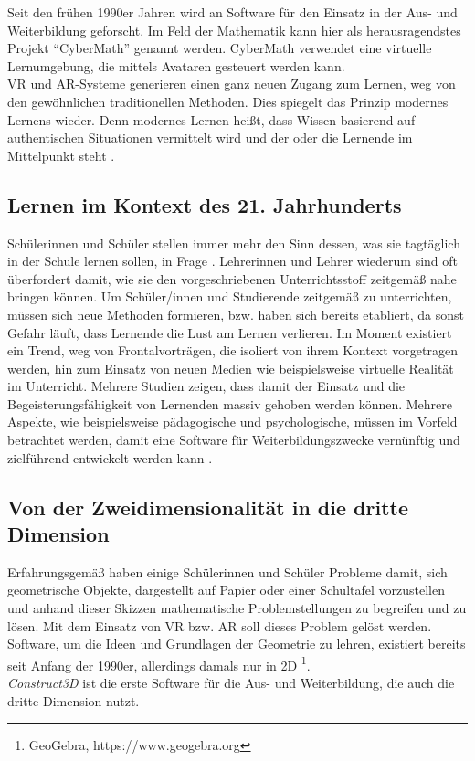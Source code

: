 \documentclass[deutsch]{llncs}
\begin{document}
Seit den frühen 1990er Jahren wird an Software für den Einsatz in der Aus- und Weiterbildung geforscht. Im Feld der Mathematik kann hier als herausragendstes Projekt ``CyberMath'' genannt werden. CyberMath verwendet eine virtuelle Lernumgebung, die mittels Avataren gesteuert werden kann. \\
VR und AR-Systeme generieren einen ganz neuen Zugang zum Lernen, weg von den gewöhnlichen traditionellen Methoden. Dies spiegelt das Prinzip modernes Lernens wieder. Denn modernes Lernen heißt, dass Wissen basierend auf authentischen Situationen vermittelt wird und der oder die Lernende im Mittelpunkt steht \cite{Klampfer,unknown}.

\subsection{Lernen im Kontext des 21. Jahrhunderts}
Schülerinnen und Schüler stellen immer mehr den Sinn dessen, was sie tagtäglich in der Schule lernen sollen, in Frage \cite{Klampfer}. Lehrerinnen und Lehrer wiederum sind oft überfordert damit, wie sie den vorgeschriebenen Unterrichtsstoff zeitgemäß nahe bringen können. Um Schüler/innen und Studierende zeitgemäß zu unterrichten, müssen sich neue Methoden formieren, bzw. haben sich bereits etabliert, da sonst Gefahr läuft, dass Lernende die Lust am Lernen verlieren. Im Moment existiert ein Trend, weg von Frontalvorträgen, die isoliert von ihrem Kontext vorgetragen werden, hin zum Einsatz von neuen Medien wie beispielsweise virtuelle Realität im Unterricht. Mehrere Studien \cite{Hu-Au} zeigen, dass damit der Einsatz und die Begeisterungsfähigkeit von Lernenden massiv gehoben werden können.
Mehrere Aspekte, wie beispielsweise pädagogische und psychologische, müssen im Vorfeld betrachtet werden, damit eine Software für Weiterbildungszwecke vernünftig und zielführend entwickelt werden kann \cite{article}.
\subsection{Von der Zweidimensionalität in die dritte Dimension}
Erfahrungsgemäß haben einige Schülerinnen und Schüler Probleme damit, sich geometrische Objekte, dargestellt auf Papier oder einer Schultafel vorzustellen und anhand dieser Skizzen mathematische Problemstellungen zu begreifen und zu lösen. Mit dem Einsatz von VR bzw. AR soll dieses Problem gelöst werden.\\
Software, um die Ideen und Grundlagen der Geometrie zu lehren, existiert bereits seit Anfang der 1990er, allerdings damals nur in 2D \footnote{GeoGebra, https://www.geogebra.org}. \\
\emph{Construct3D} ist die erste Software für die Aus- und Weiterbildung, die auch die dritte Dimension nutzt. %
\end{document}
